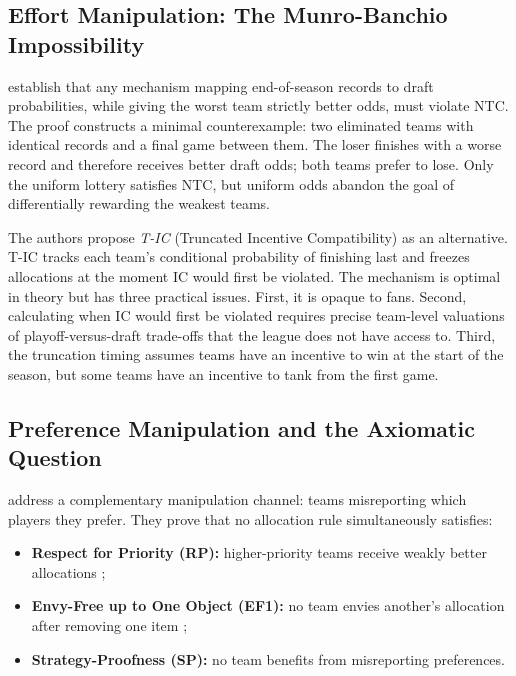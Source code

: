 \documentclass{article}
\begin{document}
\subsection{Effort Manipulation: The Munro-Banchio Impossibility}

\citet{munro2020notanking} establish that any mechanism mapping end-of-season records to draft probabilities, while giving the worst team strictly better odds, must violate NTC. The proof constructs a minimal counterexample: two eliminated teams with identical records and a final game between them. The loser finishes with a worse record and therefore receives better draft odds; both teams prefer to lose. Only the uniform lottery satisfies NTC, but uniform odds abandon the goal of differentially rewarding the weakest teams.

The authors propose \emph{T-IC} (Truncated Incentive Compatibility) as an alternative. T-IC tracks each team's conditional probability of finishing last and freezes allocations at the moment IC would first be violated. The mechanism is optimal in theory but has three practical issues. First, it is opaque to fans. Second, calculating when IC would first be violated requires precise team-level valuations of playoff-versus-draft trade-offs that the league does not have access to. Third, the truncation timing assumes teams have an incentive to win at the start of the season, but some teams have an incentive to tank from the first game.

\subsection{Preference Manipulation and the Axiomatic Question}
\label{sec:fairdiv}

\citet{coreno2022axiomatic} address a complementary manipulation channel: teams misreporting which players they prefer. They prove that no allocation rule simultaneously satisfies:
\begin{itemize}
    \item \textbf{Respect for Priority (RP):} higher-priority teams receive weakly better allocations \citep{svensson1994allocation};
    \item \textbf{Envy-Free up to One Object (EF1):} no team envies another's allocation after removing one item \citep{lipton2004approximately,budish2011combinatorial};
    \item \textbf{Strategy-Proofness (SP):} no team benefits from misreporting preferences.
\end{itemize}
\end{document}
